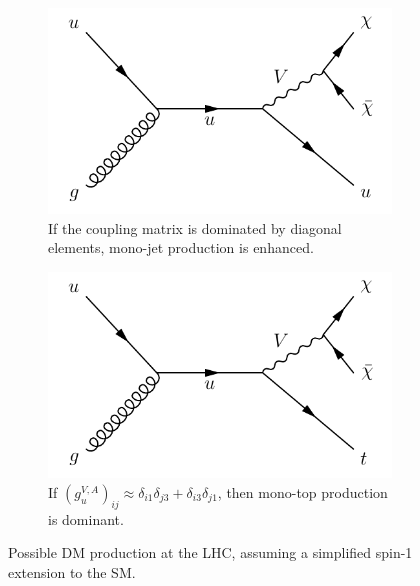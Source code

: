 \begin{figure}[!ht]
    \begin{center}
        \begin{subfigure}[t]{0.49\textwidth}
            \includegraphics[width=\textwidth]{figures/monotop/diagrams/mj.pdf}
            \caption{If the coupling matrix is dominated by diagonal elements, mono-jet production is enhanced.}
            \label{fig:mt:fcncdiaga}
        \end{subfigure}
        \begin{subfigure}[t]{0.49\textwidth}
            \includegraphics[width=\textwidth]{figures/monotop/diagrams/fcncb.pdf}
            \caption{If $(g_{u}^{V,A})_{ij} \approx \delta_{i1}\delta_{j3} + \delta_{i3}\delta_{j1}$, then mono-top production is dominant.}
            \label{fig:mt:fcncdiagb}
        \end{subfigure}
        \caption{Possible DM production at the LHC, assuming a simplified spin-1 extension to the SM.}
        \label{fig:mt:fcncdiag}
    \end{center}
\end{figure}

